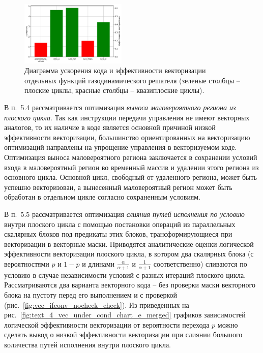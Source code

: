 \documentclass[a4paper,14pt]{extarticle}                     %
\theoremstyle{plain}                                         %
\begin{document}
\begin{figure}[!ht]
\centering
\includegraphics[width=0.45\textwidth]{./pics/text_4_ibm/diagr2.png}
\singlespacing
\caption{Диаграмма ускорения кода и эффективности векторизации отдельных функций газодинамического решателя (зеленые столбцы -- плоские циклы, красные столбцы -- квазиплоские циклы).}
\label{fig:text_4_ibm_diagr2}
\end{figure}


В п.~5.4 рассматривается оптимизация \textit{выноса маловероятного региона из плоского цикла}.
Так как инструкции передачи управления не имеют векторных аналогов, то их наличие в коде является основной причиной низкой эффективности векторизации, большинство ориентированных на векторизацию оптимизаций направлены на упрощение управления в векторизуемом коде. 
Оптимизация выноса маловероятного региона заключается в сохранении условий входа в маловероятный регион во временный массив и удалении этого региона из основного цикла.
Основной цикл, свободный от удаленного региона, может быть успешно векторизован, а вынесенный маловероятный регион может быть обработан в отдельном цикле согласно сохраненным условиям.


В п.~5.5 рассматривается оптимизация \textit{слияния путей исполнения по условию} внутри плоского цикла с помощью постановки операций из параллельных скалярных блоков под предикаты этих блоков, трансформирующиеся при векторизации в векторные маски.
Приводятся аналитические оценки логической эффективности векторизации плоского цикла, в котором два скалярных блока (с вероятностями $p$ и $1 - p$ и длинами $\frac{\alpha}{\alpha + 1}$ и $\frac{1}{\alpha + 1}$ соответственно) сливаются по условию в случае независимости условий с разных итераций плоского цикла.
Рассматриваются два варианта векторного кода -- без проверки маски векторного блока на пустоту перед его выполнением и с проверкой (рис.~\ref{fig:vec_ifconv_nocheck_check}).
Из приведенных на рис.~\ref{fig:text_4_vec_under_cond_chart_e_merged} графиков зависимостей логической эффективности векторизации от вероятности перехода $p$ можно сделать вывод о низкой эффективности векторизации при слиянии большого количества путей исполнения внутри плоского цикла.
\end{document}
